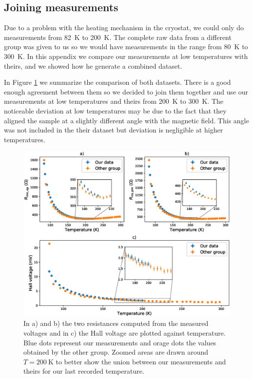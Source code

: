 \documentclass[11pt,a4paper]{article}
\begin{document}
\newpage
\begin{appendices}
\section{Joining measurements}\label{app:dataset}
Due to a problem with the heating mechanism in the cryostat, we could only do measurements from \SI{82}{\kelvin} to \SI{200}{\kelvin}. The complete raw data from a different group was given to us so we would have measurements in the range from \SI{80}{\kelvin} to \SI{300}{\kelvin}. In this appendix we compare our measurements at low temperatures with theirs, and we showed how he generate a combined dataset.

In Figure \ref{fig:comparison_datasets} we summarize the comparison of both datasets. There is a good enough agreement between them so we decided to join them together and use our measurements at low temperatures and theirs from \SI{200}{\kelvin} to \SI{300}{\kelvin}. The noticeable deviation at low temperatures may be due to the fact that they aligned the sample at a slightly different angle with the magnetic field. This angle was not included in the their dataset but deviation is negligible at higher temperatures.

\begin{figure}[ht]
\centering
\includegraphics[width=\textwidth]{comparison_datasets.eps}
\caption{In a) and b) the two resistances computed from the measured voltages and in c) the Hall voltage are plotted against temperature. Blue dots represent our measurements and orage dots the values obtained by the other group. Zoomed areas are drawn around $T=\SI{200}{\kelvin}$ to better show the union between our measurements and theirs for our last recorded temperature.}
\label{fig:comparison_datasets}
\end{figure}


\end{appendices}
\end{document}
